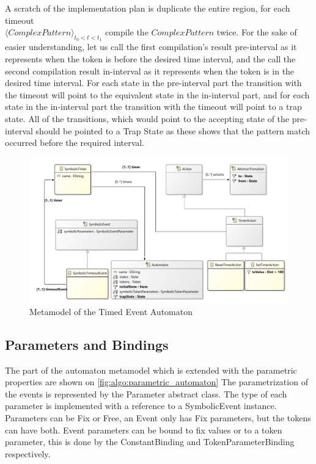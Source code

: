 A scratch of the implementation plan is duplicate the entire region, for each timeout \\ $\langle \mathit{Complex Pattern} \rangle_{t_0 < t < t_1}$ compile the $\mathit{ComplexPattern}$ twice. For the sake of easier understanding, let us call the first compilation's result  pre-interval as it represents when the token is before the desired time interval, and the call the second compilation result in-interval as it represents when the token is in the desired time interval. For each state in the pre-interval part the transition with the timeout will point to the equivalent state in the in-interval part, and for each state in the in-interval part the transition with the timeout will point to a trap state. All of the transitions, which would point to the accepting state of the pre-interval should be pointed to a Trap State as these shows that the pattern match occurred before the required interval.
  
\begin{figure}[h]
	\centering
	\includegraphics[width=\linewidth]{figures/chapter_5/Timing_diagram}
	\caption{Metamodel of the Timed Event Automaton}
	\label{fig:algo:timed_automaton}
\end{figure}

\subsection{Parameters and Bindings}
\label{section:algo:emfparameterhandilng}

The part of the automaton metamodel which is extended with the parametric properties are shown on \cref{fig:algo:parametric_automaton}
The parametrization of the events is represented by the Parameter abstract class. The type of each parameter is implemented with a reference to a SymbolicEvent instance. Parameters can be Fix or Free, an Event only has Fix parameters, but the tokens can have both. Event parameters can be bound to fix values or to a token parameter, this is done by the ConstantBinding and TokenParameterBinding respectively.

